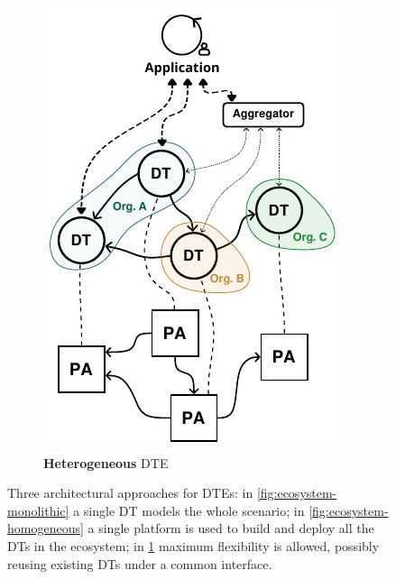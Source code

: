 \begin{figure}[ht]
\begin{subfigure}[b]{0.3\linewidth}
        \includegraphics[width=\linewidth]{figures/hwodt/ecosystems_types-heterogeneous.pdf}
        \caption{\textbf{Heterogeneous} \ac{DTE}}
        \label{fig:ecosystem-heterogeneous}
    \end{subfigure}
    \caption{Three architectural approaches for \acp{DTE}: in \ref{fig:ecosystem-monolithic} a single \ac{DT} models the whole scenario; in \ref{fig:ecosystem-homogeneous} a single platform is used to build and deploy all the \acp{DT} in the ecosystem; in \ref{fig:ecosystem-heterogeneous} maximum flexibility is allowed, possibly reusing existing \acp{DT} under a common interface.}
    \label{fig:ecosystem-types}
\end{figure}

